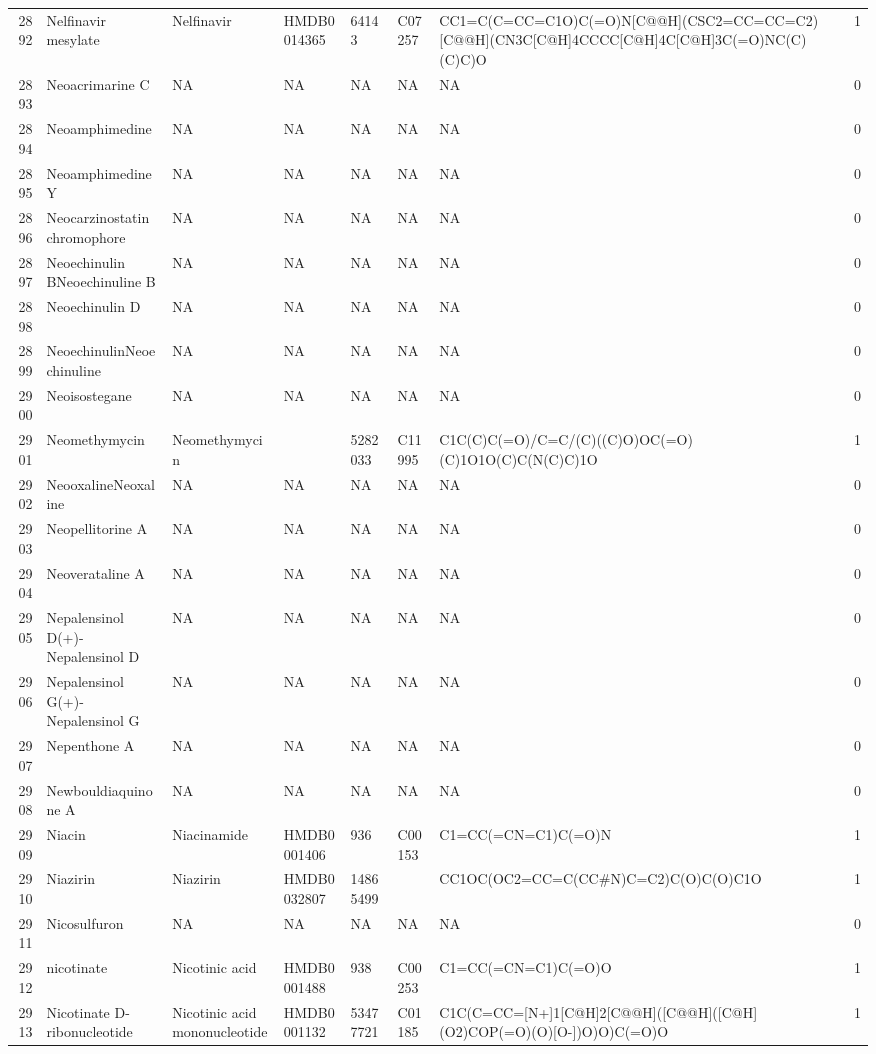 \documentclass[a4paper]{article}
\begin{document}
\begin{longtable}{rlllllll}
  2892 & Nelfinavir mesylate & Nelfinavir & HMDB0014365 & 64143 & C07257 & CC1=C(C=CC=C1O)C(=O)N[C@@H](CSC2=CC=CC=C2)[C@@H](CN3C[C@H]4CCCC[C@H]4C[C@H]3C(=O)NC(C)(C)C)O & 1 \\ 
  2893 & Neoacrimarine C & NA & NA & NA & NA & NA & 0 \\ 
  2894 & Neoamphimedine & NA & NA & NA & NA & NA & 0 \\ 
  2895 & Neoamphimedine Y & NA & NA & NA & NA & NA & 0 \\ 
  2896 & Neocarzinostatin chromophore & NA & NA & NA & NA & NA & 0 \\ 
  2897 & Neoechinulin BNeoechinuline B & NA & NA & NA & NA & NA & 0 \\ 
  2898 & Neoechinulin D & NA & NA & NA & NA & NA & 0 \\ 
  2899 & NeoechinulinNeoechinuline & NA & NA & NA & NA & NA & 0 \\ 
  2900 & Neoisostegane & NA & NA & NA & NA & NA & 0 \\ 
  2901 & Neomethymycin & Neomethymycin &  & 5282033 & C11995 & C1C(C)C(=O)/C=C/(C)((C)O)OC(=O)(C)1O1O(C)C(N(C)C)1O & 1 \\ 
  2902 & NeooxalineNeoxaline & NA & NA & NA & NA & NA & 0 \\ 
  2903 & Neopellitorine A & NA & NA & NA & NA & NA & 0 \\ 
  2904 & Neoverataline A & NA & NA & NA & NA & NA & 0 \\ 
  2905 & Nepalensinol D(+)-Nepalensinol D & NA & NA & NA & NA & NA & 0 \\ 
  2906 & Nepalensinol G(+)-Nepalensinol G & NA & NA & NA & NA & NA & 0 \\ 
  2907 & Nepenthone A & NA & NA & NA & NA & NA & 0 \\ 
  2908 & Newbouldiaquinone A & NA & NA & NA & NA & NA & 0 \\ 
  2909 & Niacin & Niacinamide & HMDB0001406 & 936 & C00153 & C1=CC(=CN=C1)C(=O)N & 1 \\ 
  2910 & Niazirin & Niazirin & HMDB0032807 & 14865499 &  & CC1OC(OC2=CC=C(CC\#N)C=C2)C(O)C(O)C1O & 1 \\ 
  2911 & Nicosulfuron & NA & NA & NA & NA & NA & 0 \\ 
  2912 & nicotinate & Nicotinic acid & HMDB0001488 & 938 & C00253 & C1=CC(=CN=C1)C(=O)O & 1 \\ 
  2913 & Nicotinate D-ribonucleotide & Nicotinic acid mononucleotide & HMDB0001132 & 53477721 & C01185 & C1C(C=CC=[N+]1[C@H]2[C@@H]([C@@H]([C@H](O2)COP(=O)(O)[O-])O)O)C(=O)O & 1 \\ 

\end{longtable}
\end{document}

